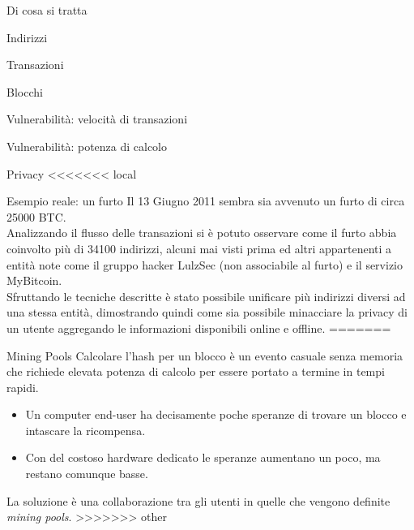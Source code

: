 \documentclass[italian]{beamer}
\begin{document}
\begin{frame}{Di cosa si tratta}
\begin{frame}{Indirizzi}
\begin{frame}{Transazioni}
\begin{frame}{Blocchi}
\begin{frame}{Vulnerabilità: velocità di transazioni}
\begin{frame}{Vulnerabilità: potenza di calcolo}
\begin{frame}{Privacy}
<<<<<<< local
\begin{frame}{Esempio reale: un furto} %
Il 13 Giugno 2011 sembra sia avvenuto un furto di circa 25000 BTC.\\
Analizzando il flusso delle transazioni si è potuto osservare come il furto abbia coinvolto più di 34100 indirizzi, alcuni mai visti prima ed altri appartenenti a entità note come il gruppo hacker LulzSec (non associabile al furto) e il servizio MyBitcoin.\\
Sfruttando le tecniche descritte è stato possibile unificare più indirizzi diversi ad una stessa entità, dimostrando quindi come sia possibile minacciare la privacy di un utente aggregando le informazioni disponibili online e offline.
=======
\begin{frame}{Mining Pools}
  Calcolare l'hash per un blocco è un evento casuale senza memoria che richiede elevata potenza di calcolo per essere portato a termine in tempi rapidi.
 \begin{itemize}
  \item Un computer end-user ha decisamente poche speranze di trovare un blocco e intascare la ricompensa.
  \item Con del costoso hardware dedicato le speranze aumentano un poco, ma restano comunque basse.
 \end{itemize}
 \bigskip
 \pause La soluzione è una collaborazione tra gli utenti in quelle che vengono definite \emph{mining pools}.
>>>>>>> other
\end{frame}


\end{frame}
\end{frame}
\end{frame}
\end{frame}
\end{frame}
\end{frame}
\end{frame}
\end{frame}
\end{document}
